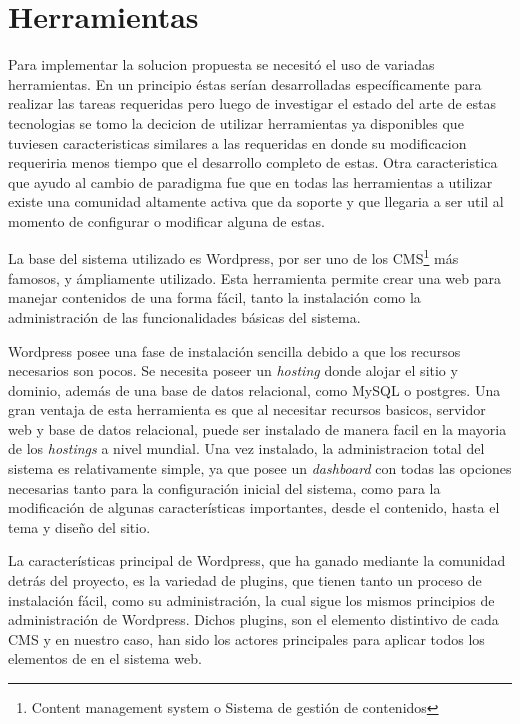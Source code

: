 \section{Herramientas}

Para implementar la solucion propuesta se necesitó el uso de variadas herramientas.
En un principio éstas serían desarrolladas específicamente para realizar las
tareas requeridas pero luego de investigar el estado del arte de estas tecnologias
se tomo la decicion de utilizar herramientas ya disponibles que tuviesen caracteristicas 
similares a las requeridas en donde su modificacion requeriria menos tiempo que el desarrollo
completo de estas. Otra caracteristica que ayudo al cambio de paradigma fue que en todas 
las herramientas a utilizar existe una comunidad altamente activa que da soporte y que 
llegaria a ser util al momento de configurar o modificar alguna de estas.

La base del sistema utilizado es Wordpress,
por ser uno de los CMS\footnote{Content management system o Sistema de gestión de contenidos}
 más famosos, y ámpliamente utilizado.
Esta herramienta permite crear una web para manejar contenidos
de una forma fácil, tanto la instalación como la administración de las
funcionalidades básicas del sistema.

Wordpress posee una fase de instalación sencilla debido a que los recursos
necesarios son pocos. Se necesita poseer un \emph{hosting} donde alojar el sitio y dominio,
además de una base de datos relacional, como MySQL o postgres. Una gran ventaja de esta
herramienta es que al necesitar recursos basicos, servidor web y base de datos relacional, 
puede ser instalado de manera facil en la mayoria de los \emph{hostings} a nivel mundial. 
Una vez instalado, la administracion total del sistema es relativamente simple,
ya que posee un \emph{dashboard} con todas las opciones necesarias
tanto para la configuración inicial del sistema, como para la modificación
de algunas características importantes, desde el contenido, hasta el tema
y diseño del sitio.

La características principal de Wordpress, que ha ganado mediante
la comunidad detrás del proyecto, es la variedad de plugins, que
tienen tanto un proceso de instalación fácil, como su administración,
la cual sigue los mismos principios de administración de Wordpress.
Dichos plugins, son el elemento distintivo de cada CMS
y en nuestro caso, han sido los actores principales para aplicar
todos los elementos de {\GAM} en el sistema web.

